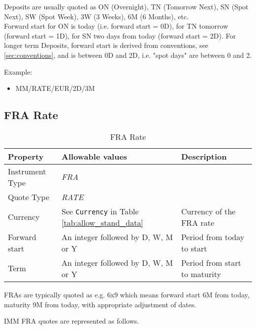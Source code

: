 Deposits are usually quoted as ON (Overnight), TN (Tomorrow Next), SN
(Spot Next), SW (Spot Week), 3W (3 Weeks), 6M (6 Months), etc. \\

Forward start for ON is today (i.e. forward start = 0D), for TN tomorrow (forward start = 1D), for SN two days from
today (forward start = 2D). For longer term Deposits, forward start is derived from conventions, see 
\ref{sec:conventions}, and is between 0D and 2D, i.e. "spot days" are between 0 and 2.

\medskip
Example:
\begin{itemize}
\item {MM/RATE/EUR/2D/3M}
\end{itemize}

\subsection{FRA Rate}

\begin{table}[H]
\centering
  \begin{tabular}{|p{3.5cm}|p{3.5cm}|p{6.5cm}|}
  \hline
    {\bf Property} & {\bf Allowable values} & {\bf Description} \\ \hline
    Instrument Type & \emph{FRA} & \\ \hline
    Quote Type & \emph{RATE} & \\ \hline
    Currency & See \lstinline!Currency! in Table \ref{tab:allow_stand_data} & Currency of the FRA rate\\ \hline
    Forward start & An integer followed by D, W, M or Y  & Period from today to start  \\ \hline
    Term & An integer followed by D, W, M or Y & Period from start to maturity\\ \hline
  \end{tabular}
  \caption{FRA Rate}
  \label{tab:fra_quote}
\end{table}
FRAs are typically quoted as e.g. 6x9 which means forward start 6M from today, maturity 9M from today, with appropriate
adjustment of dates. 

\medskip 
IMM FRA quotes are represented as follows.

